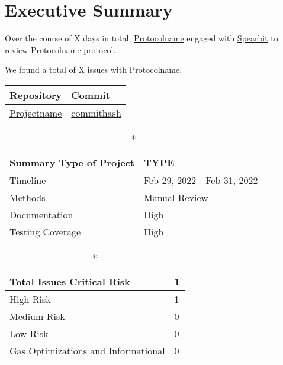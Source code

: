 \hypertarget{executive-summary}{%
\section{Executive Summary}\label{executive-summary}}

Over the course of X days in total, \href{https://protocolname.come}{Protocolname} engaged with
\href{https://spearbit.com}{Spearbit} to review
\href{https://github.com/permalink-to-protocolname}{Protocolname protocol}. 

We found a total of X issues with Protocolname. 

\begin{longtable}[c]{|l|l|}
\hline \textbf{Repository} & \textbf{Commit} \\

\hline
\href{https://github.com/permalink}{Projectname} &
\href{https://github.com/permalink/commit/commithash}{commithash} \\
\hline
\end{longtable}

\begin{longtable}[]{|l|l|}

\caption*{\textbf{Summary}}
\hline Type of Project & TYPE \\   
\hline Timeline & Feb 29, 2022 - Feb 31, 2022   \\
\hline Methods & Manual Review \\
\hline Documentation & High \\
\hline Testing Coverage & High  \\
\hline
\end{longtable}


\begin{longtable}[]{|l|l|}
\caption*{\textbf{Total Issues}}
\hline Critical Risk & 1 \\
\hline High Risk & 1 \\
\hline Medium Risk & 0 \\ 
\hline Low Risk & 0 \\
\hline Gas Optimizations and Informational & 0 \\
\hline
\end{longtable}

